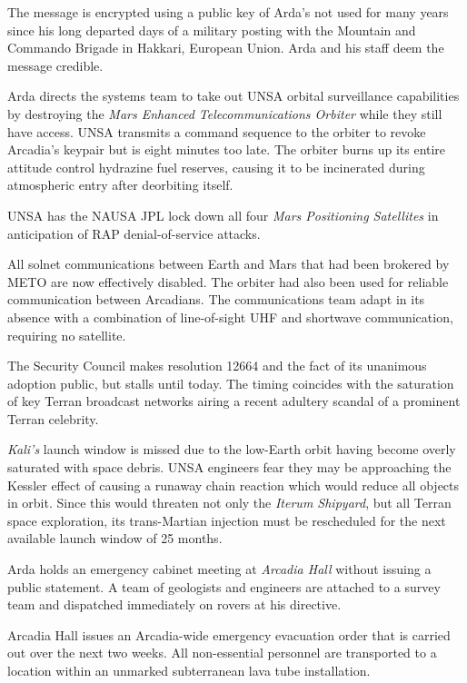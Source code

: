 The message is encrypted using a public key of Arda's not used for many years since his long departed days of a military posting with the Mountain and Commando Brigade in Hakkari, European Union. Arda and his staff deem the message credible.
\StopTimelineDate

Arda directs the systems team to take out UNSA orbital surveillance capabilities by destroying the {\it Mars Enhanced Telecommunications Orbiter} while they still have access. UNSA transmits a command sequence to the orbiter to revoke Arcadia's keypair but is eight minutes too late. The orbiter burns up its entire attitude control hydrazine fuel reserves, causing it to be incinerated during atmospheric entry after deorbiting itself.

UNSA has the NAUSA JPL lock down all four {\it Mars Positioning Satellites} in anticipation of RAP denial-of-service attacks.

All solnet communications between Earth and Mars that had been brokered by METO are now effectively disabled. The orbiter had also been used for reliable communication between Arcadians. The communications team adapt in its absence with a combination of line-of-sight UHF and shortwave communication, requiring no satellite.
\StopTimelineDate

The Security Council makes resolution 12664 and the fact of its unanimous adoption public, but stalls until today. The timing coincides with the saturation of key Terran broadcast networks airing a recent adultery scandal of a prominent Terran celebrity.
\StopTimelineDate

{\it Kali's} launch window is missed due to the low-Earth orbit having become overly saturated with space debris. UNSA engineers fear they may be approaching the Kessler effect of causing a runaway chain reaction which would reduce all objects in orbit. Since this would threaten not only the {\it Iterum Shipyard}, but all Terran space exploration, its trans-Martian injection must be rescheduled for the next available launch window of 25 months.
\StopTimelineDate

Arda holds an emergency cabinet meeting at {\it Arcadia Hall} without issuing a public statement. A team of geologists and engineers are attached to a survey team and dispatched immediately on rovers at his directive.
\StopTimelineDate

Arcadia Hall issues an Arcadia-wide emergency evacuation order that is carried out over the next two weeks. All non-essential personnel are transported to a location within an unmarked subterranean lava tube installation.
\StopTimelineDate


